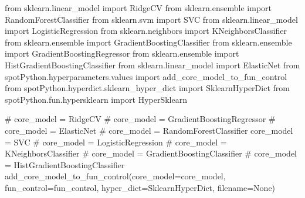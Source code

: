 \documentclass[
  letterpaper,
  DIV=11,
  numbers=noendperiod]{scrreprt}
\newenvironment{Shaded}{\begin{snugshade}}{\end{snugshade}}
\newcommand{\CommentTok}[1]{\textcolor[rgb]{0.37,0.37,0.37}{#1}}
\newcommand{\ImportTok}[1]{\textcolor[rgb]{0.00,0.46,0.62}{#1}}
\newcommand{\NormalTok}[1]{\textcolor[rgb]{0.00,0.23,0.31}{#1}}
\newcommand{\OperatorTok}[1]{\textcolor[rgb]{0.37,0.37,0.37}{#1}}
\newcommand{\VariableTok}[1]{\textcolor[rgb]{0.07,0.07,0.07}{#1}}
\begin{document}
\begin{Shaded}
\begin{Highlighting}[]
\ImportTok{from}\NormalTok{ sklearn.linear\_model }\ImportTok{import}\NormalTok{ RidgeCV}
\ImportTok{from}\NormalTok{ sklearn.ensemble }\ImportTok{import}\NormalTok{ RandomForestClassifier}
\ImportTok{from}\NormalTok{ sklearn.svm }\ImportTok{import}\NormalTok{ SVC}
\ImportTok{from}\NormalTok{ sklearn.linear\_model }\ImportTok{import}\NormalTok{ LogisticRegression}
\ImportTok{from}\NormalTok{ sklearn.neighbors }\ImportTok{import}\NormalTok{ KNeighborsClassifier}
\ImportTok{from}\NormalTok{ sklearn.ensemble }\ImportTok{import}\NormalTok{ GradientBoostingClassifier}
\ImportTok{from}\NormalTok{ sklearn.ensemble }\ImportTok{import}\NormalTok{ GradientBoostingRegressor}
\ImportTok{from}\NormalTok{ sklearn.ensemble }\ImportTok{import}\NormalTok{ HistGradientBoostingClassifier}
\ImportTok{from}\NormalTok{ sklearn.linear\_model }\ImportTok{import}\NormalTok{ ElasticNet}
\ImportTok{from}\NormalTok{ spotPython.hyperparameters.values }\ImportTok{import}\NormalTok{ add\_core\_model\_to\_fun\_control}
\ImportTok{from}\NormalTok{ spotPython.hyperdict.sklearn\_hyper\_dict }\ImportTok{import}\NormalTok{ SklearnHyperDict}
\ImportTok{from}\NormalTok{ spotPython.fun.hypersklearn }\ImportTok{import}\NormalTok{ HyperSklearn}
\end{Highlighting}
\end{Shaded}

\begin{Shaded}
\begin{Highlighting}[]
\CommentTok{\# core\_model  = RidgeCV}
\CommentTok{\# core\_model = GradientBoostingRegressor}
\CommentTok{\# core\_model = ElasticNet}
\CommentTok{\# core\_model = RandomForestClassifier}
\NormalTok{core\_model }\OperatorTok{=}\NormalTok{ SVC}
\CommentTok{\# core\_model = LogisticRegression}
\CommentTok{\# core\_model = KNeighborsClassifier}
\CommentTok{\# core\_model = GradientBoostingClassifier}
\CommentTok{\# core\_model = HistGradientBoostingClassifier}
\NormalTok{add\_core\_model\_to\_fun\_control(core\_model}\OperatorTok{=}\NormalTok{core\_model,}
\NormalTok{                              fun\_control}\OperatorTok{=}\NormalTok{fun\_control,}
\NormalTok{                              hyper\_dict}\OperatorTok{=}\NormalTok{SklearnHyperDict,}
\NormalTok{                              filename}\OperatorTok{=}\VariableTok{None}\NormalTok{)}
\end{Highlighting}
\end{Shaded}
\end{document}
